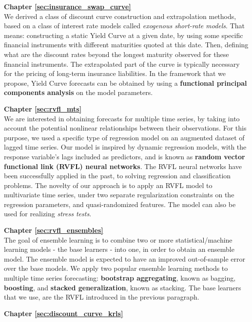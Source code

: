 \textbf{Chapter \ref{sec:insurance_swap_curve}} \\[0.2em]

We derived a class of discount curve construction and extrapolation methods,  based on a class of interest rate models called \textit{exogenous short-rate models}. That means: constructing a static Yield Curve at a given date, by using some specific financial instruments with different maturities quoted at this date. Then, defining what are the discount rates beyond the longest maturity observed for these financial instruments. The extrapolated part of the curve is typically necessary for the pricing of long-term insurance liabilities. In the framework that we propose, Yield Curve forecasts can be obtained by using a \textbf{functional principal components analysis} on the model parameters.

\textbf{Chapter \ref{sec:rvfl_mts}} \\[0.2em]

We are interested in obtaining forecasts for multiple time series, by taking into account the potential nonlinear relationships between their observations. For this purpose, we used a specific type of regression model on an augmented dataset of lagged time series. Our model is inspired by dynamic regression models, with the response variable's lags included as predictors, and is known as \textbf{random vector functional link (RVFL) neural networks}. The RVFL neural networks have been successfully applied in the past, to solving regression and classification problems. The novelty of our approach is to apply an RVFL model to multivariate time series, under two separate regularization constraints on the regression parameters, and quasi-randomized features. The model can also be used for realizing \textit{stress tests}. 

\textbf{Chapter \ref{sec:rvfl_ensembles}} \\[0.2em]

The goal of ensemble learning is to combine two or more statistical/machine learning models - the base learners - into one, in order to obtain an ensemble model. The ensemble model is expected to have an improved out-of-sample error over the base models. We apply two popular ensemble learning methods to multiple time series forecasting: \textbf{bootstrap aggregating}, known as bagging, \textbf{boosting}, and \textbf{stacked generalization}, known as stacking. The base learners that we use, are the RVFL introduced in the previous paragraph.


\textbf{Chapter \ref{sec:discount_curve_krls}} \\[0.2em]

